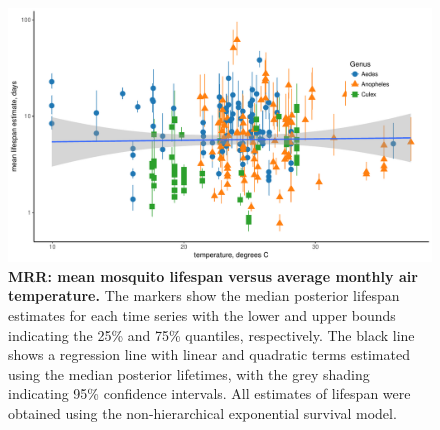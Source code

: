 \documentclass[12pt]{article}
\begin{document}
\begin{figure}[h]
	\centerline{\includegraphics[width=1\textwidth]{./Figure_files/mrr_lifeSpanVsTemperature.pdf}}
	\caption{\textbf{MRR: mean mosquito lifespan versus average monthly air temperature.} The markers show the median posterior lifespan estimates for each time series with the lower and upper bounds indicating the 25\% and 75\% quantiles, respectively. The black line shows a regression line with linear and quadratic terms estimated using the median posterior lifetimes, with the grey shading indicating 95\% confidence intervals. All estimates of lifespan were obtained using the non-hierarchical exponential survival model.}\label{fig:mrr_temperature}
\end{figure}
\end{document}
